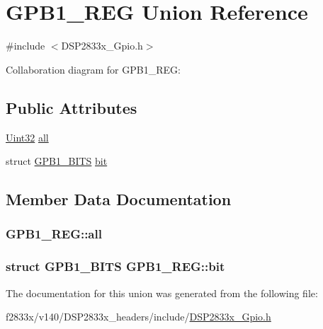 \hypertarget{union_g_p_b1___r_e_g}{}\section{G\+P\+B1\+\_\+\+R\+E\+G Union Reference}
\label{union_g_p_b1___r_e_g}


{\ttfamily \#include $<$D\+S\+P2833x\+\_\+\+Gpio.\+h$>$}



Collaboration diagram for G\+P\+B1\+\_\+\+R\+E\+G\+:
\subsection*{Public Attributes}
\begin{DoxyCompactItemize}
\item 
\hyperlink{_d_s_p2833x___device_8h_aba99025e657f892beb7ff31cecf64653}{Uint32} \hyperlink{union_g_p_b1___r_e_g_ac8f6e54fd1cd26295cc2e54ee5bd9230}{all}
\item 
struct \hyperlink{struct_g_p_b1___b_i_t_s}{G\+P\+B1\+\_\+\+B\+I\+T\+S} \hyperlink{union_g_p_b1___r_e_g_a227ff344e3623960e459c3f6170cbf32}{bit}
\end{DoxyCompactItemize}


\subsection{Member Data Documentation}
\hypertarget{union_g_p_b1___r_e_g_ac8f6e54fd1cd26295cc2e54ee5bd9230}{}
\subsubsection[{all}]{ G\+P\+B1\+\_\+\+R\+E\+G\+::all}\label{union_g_p_b1___r_e_g_ac8f6e54fd1cd26295cc2e54ee5bd9230}
\hypertarget{union_g_p_b1___r_e_g_a227ff344e3623960e459c3f6170cbf32}{}
\subsubsection[{bit}]{\setlength{\rightskip}{0pt plus 5cm}struct {\bf G\+P\+B1\+\_\+\+B\+I\+T\+S} G\+P\+B1\+\_\+\+R\+E\+G\+::bit}\label{union_g_p_b1___r_e_g_a227ff344e3623960e459c3f6170cbf32}


The documentation for this union was generated from the following file\+:\begin{DoxyCompactItemize}
\item 
f2833x/v140/\+D\+S\+P2833x\+\_\+headers/include/\hyperlink{_d_s_p2833x___gpio_8h}{D\+S\+P2833x\+\_\+\+Gpio.\+h}\end{DoxyCompactItemize}
